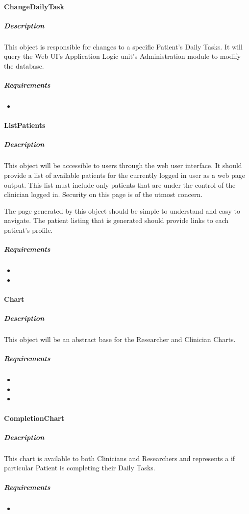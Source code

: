 \documentclass{article}
\begin{document}
\paragraph{ChangeDailyTask}
\subparagraph{Description}
This object is responsible for changes to a specific Patient's Daily Tasks. It will query the Web UI's Application Logic unit's Administration module to modify the database. 
\subparagraph{Requirements}
\begin{itemize}
\item {}
\end{itemize}

\paragraph{ListPatients}
\subparagraph{Description}
This object will be accessible to users through the web user interface. It should provide a list of available patients for the currently logged in user as a web page output. This list must include only patients that are under the control of the clinician logged in. Security on this page is of the utmost concern.

The page generated by this object should be simple to understand and easy to navigate. The patient listing that is generated should provide links to each patient's profile. 

\subparagraph{Requirements}
\begin{itemize}
\item {}
\item {}
\end{itemize}

\paragraph{Chart}
\subparagraph{Description}
This object will be an abstract base for the Researcher and Clinician Charts.
\subparagraph{Requirements}
\begin{itemize}
\item {}
\item {}
\item {}
\end{itemize}
\paragraph{CompletionChart}
\subparagraph{Description}
This chart is available to both Clinicians and Researchers and represents a if particular Patient is completing their Daily Tasks. 
\subparagraph{Requirements}
\begin{itemize}
\item {}
\end{itemize}
\end{document}
